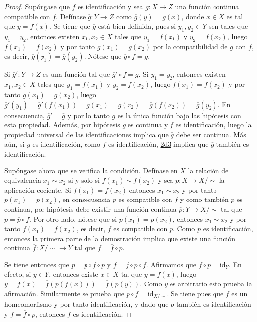 \begin{proof}
Supóngase que $f$ es identificación y sea $g : X \longrightarrow Z$ una función continua compatible con $f$. Defínase $\overline{g} : Y \longrightarrow Z$ como $\overline{g}(y) = g(x)$, donde $x \in X$ es tal que $y = f(x)$. Se tiene que $\overline{g}$ está bien definida, pues si $y_1, y_2 \in Y$ son tales que $y_1 = y_2$, entonces existen $x_1, x_2 \in X$ tales que $y_1 = f(x_1)$ y $y_2 = f(x_2)$, luego $f(x_1) = f(x_2)$ y por tanto $g(x_1) = g(x_2)$ por la compatibilidad de $g$ con $f$, es decir, $\overline{g}(y_1) = \overline{g}(y_2)$. Nótese que $\overline{g} \circ f = g$.
\bigskip

Si $\overline{g}' : Y \longrightarrow Z$ es una función tal que $\overline{g}' \circ f = g$. Si $y_1 = y_2$, entonces existen $x_1, x_2 \in X$ tales que $y_1 = f(x_1)$ y $y_2 = f(x_2)$, luego $f(x_1) = f(x_2)$ y por tanto $g(x_1) = g(x_2)$, luego $\overline{g}'(y_1) = \overline{g}'(f(x_1)) = g(x_1) = g(x_2) = \overline{g}(f(x_2)) = \overline{g}(y_2)$. En consecuencia, $\overline{g}' = \overline{g}$ y por lo tanto $g$ es la única función bajo las hipótesis con esta propiedad. Además, por hipótesis $g$ es continua y $f$ es identificación, luego la propiedad universal de las identificaciones implica que $\overline{g}$ debe ser continua. Más aún, si $g$ es identificación, como $f$ es identificación, \hyperref[card:2d3]{\textsf{2d3}} implica que $\overline{g}$ también es identificación.
\bigskip

Supóngase ahora que se verifica la condición. Defínase en $X$ la relación de equivalencia $x_1 \sim x_2$ si y sólo si $f(x_1) \sim f(x_2)$ y sea $p : X \longrightarrow X/\sim$ la aplicación cociente. Si $f(x_1) = f(x_2)$ entonces $x_1 \sim x_2$ y por tanto $p(x_1) = p(x_2)$, en consecuencia $p$ es compatible con $f$ y como también $p$ es continua, por hipótesis debe existir una función continua $\overline{p} : Y \longrightarrow X/\sim$ tal que $p = \overline{p} \circ f$. Por otro lado, nótese que si $p(x_1) = p(x_2)$, entonces $x_1 \sim x_2$ y por tanto $f(x_1) = f(x_2)$, es decir, $f$ es compatible con $p$. Como $p$ es identificación, entonces la primera parte de la demostración implica que existe una función continua $\overline{f} : X/\sim \longrightarrow Y$ tal que $f = \overline{f} \circ p$.
\bigskip

Se tiene entonces que $p = \overline{p} \circ \overline{f} \circ p$ y $f = \overline{f} \circ \overline{p} \circ f$. Afirmamos que $\overline{f} \circ \overline{p} = \text{id}_Y$. En efecto, si $y \in Y$, entonces existe $x \in X$ tal que $y = f(x)$, luego $y = f(x) = \overline{f}(\overline{p}(f(x))) = \overline{f}(\overline{p}(y))$. Como $y$ es arbitrario esto prueba la afirmación. Similarmente se prueba que $\overline{p} \circ \overline{f} = \text{id}_{X/\sim}$. Se tiene pues que $\overline{f}$ es un homeomorfismo y por tanto identificación, y dado que $p$ también es identificación y $f = \overline{f} \circ p$, entonces $f$ es identificación.
\end{proof}
